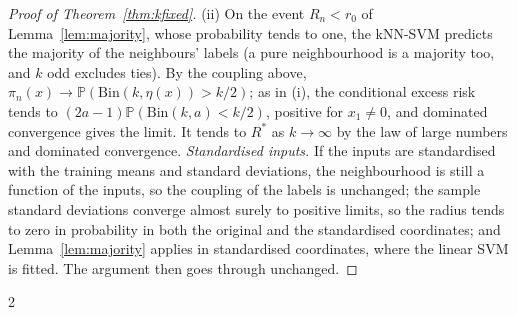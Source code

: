\documentclass[11pt,a4paper]{article}
\theoremstyle{plain}
\theoremstyle{definition}
\theoremstyle{remark}
\newcommand{\Prob}{\mathbb{P}}
\newcommand{\Risk}{R}
\begin{document}
\begin{proof}[Proof of Theorem~\ref{thm:kfixed}]
(ii) On the event $R_n<r_0$ of Lemma~\ref{lem:majority}, whose probability tends to one, the kNN-SVM predicts the majority of the neighbours' labels (a pure neighbourhood is a majority too, and $k$ odd excludes ties). By the coupling above, $\pi_n(x)\to\Prob(\mathrm{Bin}(k,\eta(x))>k/2)$; as in (i), the conditional excess risk tends to $(2a-1)\Prob(\mathrm{Bin}(k,a)<k/2)$, positive for $x_1\neq0$, and dominated convergence gives the limit. It tends to $\Risk^*$ as $k\to\infty$ by the law of large numbers and dominated convergence. \emph{Standardised inputs.} If the inputs are standardised with the training means and standard deviations, the neighbourhood is still a function of the inputs, so the coupling of the labels is unchanged; the sample standard deviations converge almost surely to positive limits, so the radius tends to zero in probability in both the original and the standardised coordinates; and Lemma~\ref{lem:majority} applies in standardised coordinates, where the linear SVM is fitted. The argument then goes through unchanged.
\end{proof}

\renewcommand{\bibfont}{\footnotesize}
\setlength{\bibsep}{1pt plus 0.5pt}

\begin{multicols}{2}

\end{multicols}
\end{document}
